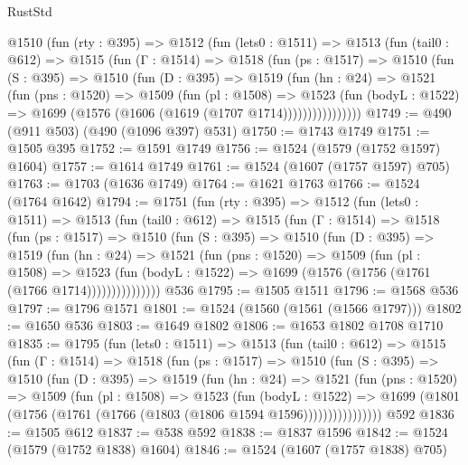 \begin{lexlean}{RustStd}
\begin{coremodule}
    @1510
      (fun (rty : @395) =>
      @1512
        (fun (lets0 : @1511) =>
        @1513
          (fun (tail0 : @612) =>
          @1515
            (fun (Γ : @1514) =>
            @1518
              (fun (ps : @1517) =>
              @1510
                (fun (S : @395) =>
                @1510
                  (fun (D : @395) =>
                  @1519
                    (fun (hn : @24) =>
                    @1521
                      (fun (pns : @1520) =>
                      @1509
                        (fun (pl : @1508) =>
                        @1523
                          (fun (bodyL : @1522) =>
                          @1699 (@1576 (@1606 (@1619 (@1707 @1714))))))))))))))))
@1749 := @490 (@911 @503) (@490 (@1096 @397) @531)
@1750 := @1743 @1749
@1751 := @1505 @395
@1752 := @1591 @1749
@1756 := @1524 (@1579 (@1752 @1597) @1604)
@1757 := @1614 @1749
@1761 := @1524 (@1607 (@1757 @1597) @705)
@1763 := @1703 (@1636 @1749)
@1764 := @1621 @1763
@1766 := @1524 (@1764 @1642)
@1794 := @1751
    (fun (rty : @395) =>
    @1512
      (fun (lets0 : @1511) =>
      @1513
        (fun (tail0 : @612) =>
        @1515
          (fun (Γ : @1514) =>
          @1518
            (fun (ps : @1517) =>
            @1510
              (fun (S : @395) =>
              @1510
                (fun (D : @395) =>
                @1519
                  (fun (hn : @24) =>
                  @1521
                    (fun (pns : @1520) =>
                    @1509
                      (fun (pl : @1508) =>
                      @1523
                        (fun (bodyL : @1522) =>
                        @1699 (@1576 (@1756 (@1761 (@1766 @1714)))))))))))))))
    @536
@1795 := @1505 @1511
@1796 := @1568 @536
@1797 := @1796 @1571
@1801 := @1524 (@1560 (@1561 (@1566 @1797)))
@1802 := @1650 @536
@1803 := @1649 @1802
@1806 := @1653 @1802 @1708 @1710
@1835 := @1795
    (fun (lets0 : @1511) =>
    @1513
      (fun (tail0 : @612) =>
      @1515
        (fun (Γ : @1514) =>
        @1518
          (fun (ps : @1517) =>
          @1510
            (fun (S : @395) =>
            @1510
              (fun (D : @395) =>
              @1519
                (fun (hn : @24) =>
                @1521
                  (fun (pns : @1520) =>
                  @1509
                    (fun (pl : @1508) =>
                    @1523
                      (fun (bodyL : @1522) =>
                      @1699 (@1801 (@1756 (@1761 (@1766 (@1803 (@1806 @1594 @1596))))))))))))))))
    @592
@1836 := @1505 @612
@1837 := @538 @592
@1838 := @1837 @1596
@1842 := @1524 (@1579 (@1752 @1838) @1604)
@1846 := @1524 (@1607 (@1757 @1838) @705)

\end{coremodule}
\end{lexlean}
